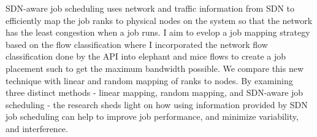 SDN-aware job scheduling uses network and traffic information from
SDN to efficiently map the job ranks to physical nodes on the system 
so that the network has the least congestion when a job runs.
I aim to evelop a job mapping strategy based on the 
flow classification where I incorporated the network flow 
classification done by the API into elephant and mice flows 
to create a job placement such to get the maximum bandwidth possible. 
We compare this new technique with linear and random mapping of ranks to nodes.
By examining three distinct 
methods - linear mapping, random mapping, and SDN-aware job scheduling - 
the research sheds light on how using information provided by SDN 
job scheduling can help to improve job performance, and minimize
variability, and interference. 

